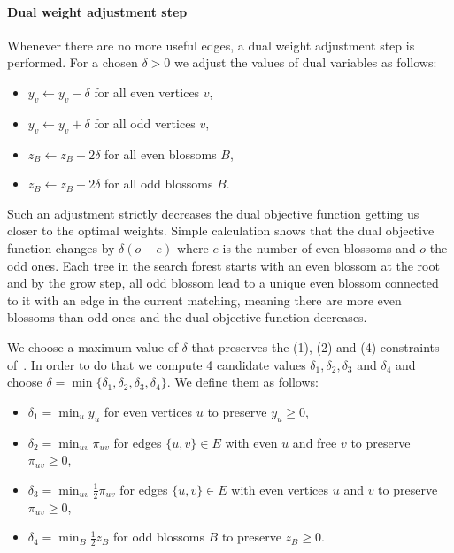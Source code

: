 \paragraph*{Dual weight adjustment step}

Whenever there are no more useful edges, a dual weight adjustment step is performed. For a chosen $\delta > 0$ we adjust the values of dual variables as follows:

\begin{itemize}
    \item $y_v \gets y_v - \delta$ for all even vertices $v$,
    \item $y_v \gets y_v + \delta$ for all odd vertices $v$,
    \item $z_B \gets z_B + 2\delta$ for all even blossoms $B$,
    \item $z_B \gets z_B - 2\delta$ for all odd blossoms $B$.
\end{itemize}

Such an adjustment strictly decreases the dual objective function getting us closer to the optimal weights. Simple calculation shows that the dual objective function changes by $\delta(o - e)$ where $e$ is the number of even blossoms and $o$ the odd ones. Each tree in the search forest starts with an even blossom at the root and by the grow step, all odd blossom lead to a unique even blossom connected to it with an edge in the current matching, meaning there are more even blossoms than odd ones and the dual objective function decreases.

We choose a maximum value of $\delta$ that preserves the (1), (2) and (4) constraints of~. In order to do that we compute 4 candidate values $\delta_1, \delta_2, \delta_3$ and $\delta_4$ and choose $\delta = \min \{\delta_1, \delta_2, \delta_3, \delta_4\}$. We define them as follows:

\begin{itemize}
    \item $\delta_1 = \min_{u} y_u$ for even vertices $u$ to preserve $y_u \geq 0$,
    \item $\delta_2 = \min_{uv} \pi_{uv}$ for edges $\{u, v\} \in E$ with even $u$ and free $v$ to preserve $\pi_{uv} \geq 0$,
    \item $\delta_3 = \min_{uv} \frac{1}{2}\pi_{uv}$ for edges $\{u, v\} \in E$ with even vertices $u$ and $v$ to preserve $\pi_{uv} \geq 0$,
    \item $\delta_4 = \min_{B} \frac{1}{2} z_B$ for odd blossoms $B$ to preserve $z_B \geq 0$.
\end{itemize}

